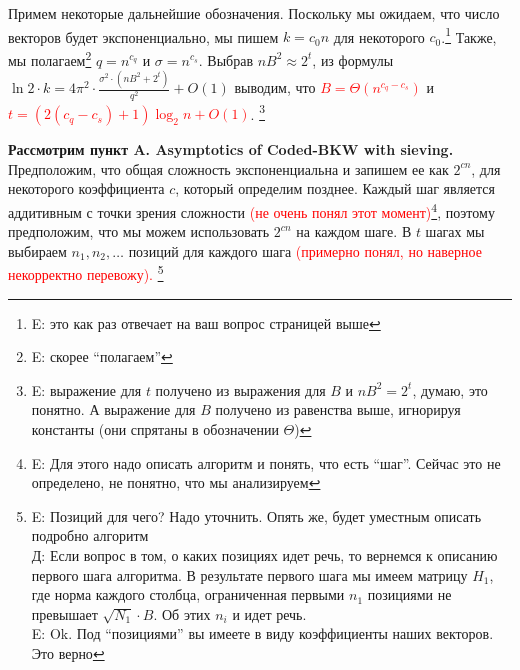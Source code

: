 \documentclass[a4paper,11pt]{article}
\begin{document}
Примем некоторые дальнейшие обозначения. Поскольку мы ожидаем, что число векторов будет экспоненциально, мы пишем $k=c_0n$ для некоторого $c_0$.\footnote{E: это как раз отвечает на ваш вопрос страницей выше} Также, мы полагаем\footnote{E: скорее ``полагаем''} $q=n^{c_q}$ и $\sigma=n^{c_s}$. Выбрав $nB^2\approx2^t$, из формулы $\ln{2} \cdot k = 4\pi^2 \cdot \frac{\sigma^2 \cdot (nB^2+2^t)}{q^2} + O(1)$ выводим, что \textcolor{red}{$B=\Theta(n^{c_q-c_s})$} и \textcolor{red}{$t=(2(c_q-c_s)+1)\log_2 n + O(1)$}. \footnote{E: выражение для $t$ получено из выражения для $B$ и $nB^2 = 2^t$, думаю, это понятно. А выражение для $B$ получено из равенства выше, игнорируя константы (они спрятаны в обозначении $\Theta$)}

\textbf{Рассмотрим пункт A. Asymptotics of Coded-BKW with sieving.}\\

Предположим, что общая сложность экспоненциальна и запишем ее как $2^{cn}$, для некоторого коэффициента $c$, который определим позднее. Каждый шаг является аддитивным с точки зрения сложности \textcolor{red}{(не очень понял этот момент)}\footnote{E: Для этого надо описать алгоритм и понять, что есть ``шаг''. Сейчас это не определено, не понятно, что мы анализируем}, поэтому предположим, что мы можем использовать $2^{cn}$ на каждом шаге. В $t$ шагах мы выбираем $n_1,n_2,…$ позиций для каждого шага  \textcolor{red}{(примерно понял, но наверное некорректно перевожу). \footnote{E: Позиций для чего? Надо уточнить. Опять же, будет уместным описать подробно алгоритм \\ Д: Если вопрос в том, о каких позициях идет речь, то вернемся к описанию первого шага алгоритма. В результате первого шага мы имеем матрицу $H_1$, где норма каждого столбца, ограниченная первыми $n_1$ позициями не превышает $\sqrt{N_1}\cdot B$. Об этих $n_i$ и идет речь. \\
E: Ok. Под ``позициями'' вы имеете в виду коэффициенты наших векторов. Это верно
}}
\end{document}
